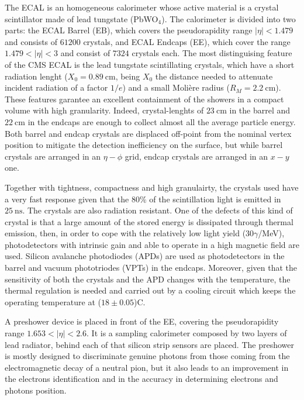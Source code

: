 The ECAL is an homogeneous calorimeter whose active material is a crystal scintillator 
made of lead tungstate (PbWO$_4$). The calorimeter is divided into two parts: 
the ECAL Barrel (EB), which covers the pseudorapidity range $|\eta|< 1.479$
and consists of $61200$ crystals, and ECAL Endcaps (EE), which cover the range $1.479<|\eta|<3$ and consist of $7324$ crystals each.
The most distinguising feature of the CMS ECAL is the lead tungstate scintillating crystals, which
have a short radiation lenght ($X_0=0.89~\si{\cm}$, being $X_0$ the distance needed to attenuate incident 
radiation of a factor $1/e$) and a small Moli\`ere radius ($R_M=2.2~\si{\cm}$). These
features garantee an excellent containment of the showers in a compact volume with high granularity.
Indeed, crystal-lenghts of $23~\si{\cm}$ in the barrel and $22~\si{\cm}$ in the endcaps are enough
to collect almost all the average particle energy. Both barrel and endcap crystals are
displaced off-point from the nominal vertex position to mitigate the detection inefficiency
on the surface, but while barrel crystals are arranged in an $\eta-\phi$ grid, endcap crystals are arranged in an $x-y$ one.

Together with tightness, compactness and high granulairty, the crystals used have a very fast response
given that the 80\% of the scintillation light is emitted in $25~\si{\ns}$. The crystals are also radiation resistant. 
One of the defects of this kind of crystal is that a large amount
of the stored energy is dissipated through thermal emission, then, in order to cope with the relatively low light yield 
($30\gamma$/\si{\MeV}), photodetectors with intrinsic gain and able to operate in a high magnetic field are used.
Silicon avalanche photodiodes (APDs) are used as photodetectors in the barrel and
vacuum phototriodes (VPTs) in the endcaps. Moreover, given that the sensitivity of both the crystals
and the APD changes with the temperature, the thermal regulation is needed and carried out by a cooling circuit which 
keeps the operating temperature at ($18\pm0.05$)\textdegree C. 

A preshower device is placed in front of the EE, covering the pseudorapidity range 
$1.653<|\eta|<2.6$. It is a sampling calorimeter composed by two layers of
lead radiator, behind each of that silicon strip sensors are placed.
The preshower is mostly designed to discriminate genuine photons from those
coming from the electromagnetic decay of a neutral pion, but it also leads to an improvement in the 
electrons identification and in the accuracy in determining electrons and photons position.

